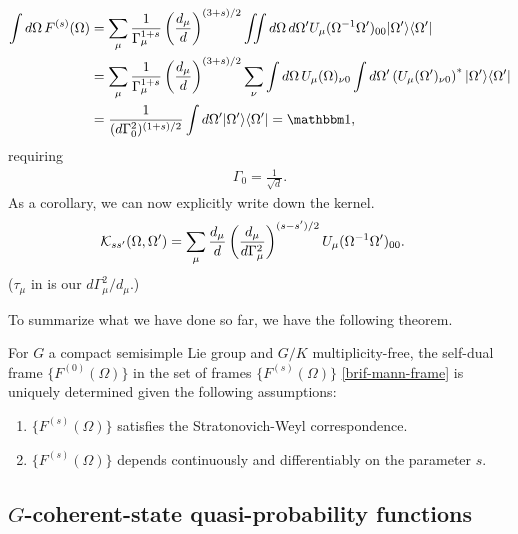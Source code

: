 \begin{align}
\int d\Omega\,F^{(s)}(\Omega) &= \sum_{\mu} \frac{1}{\Gamma_{\mu}^{1+s}} \left( \frac{d_{\mu}}{d} \right)^{(3+s)/2}
\iint d\Omega\,d\Omega' \rep_{\mu}(\Omega^{-1}\Omega')_{00} \ketbra{\Omega'}{\Omega'} \nonumber \\
&= \sum_{\mu} \frac{1}{\Gamma_{\mu}^{1+s}} \left( \frac{d_{\mu}}{d} \right)^{(3+s)/2} \sum_{\nu}
\int d\Omega\,\rep_{\mu} (\Omega)_{\nu 0} \int d\Omega' \left( \rep_{\mu} (\Omega')_{\nu 0} \right)^* \ketbra{\Omega'}{\Omega'} \nonumber \\
&= \frac{1}{(d\Gamma_{0}^2)^{(1+s)/2}} \int d\Omega' \ketbra{\Omega'}{\Omega'} = \id,
\end{align}
requiring
\begin{align}
\Gamma_{0} = \frac{1}{\sqrt{d}}.
\end{align}
As a corollary, we can now explicitly write down the kernel.
\begin{align}
\mathcal{K}_{ss'}(\Omega,\Omega') &= \sum_{\mu} \frac{d_{\mu}}{d} \left( \frac{ d_{\mu}}{d \Gamma^2_{\mu}} \right)^{(s-s')/2} U_{\mu}(\Omega^{-1}\Omega')_{00}.
\end{align}
($\tau_{\mu}$ in \cite{brif_phase-space_1999} is our $d\Gamma_{\mu}^2/d_{\mu}$.)

To summarize what we have done so far, we have the following theorem.
\begin{theorem}\label{thm:brif-mann-frame}
	For $G$ a compact semisimple Lie group and $G/K$ multiplicity-free, the self-dual frame $\{F^{(0)}(\Omega)\}$ in the set of frames $\{F^{(s)}(\Omega)\}$ \eqref{brif-mann-frame} is uniquely determined given the following assumptions:
	\begin{enumerate}
		\item $\{F^{(s)}(\Omega)\}$ satisfies the Stratonovich-Weyl correspondence.
		\item $\{F^{(s)}(\Omega)\}$ depends continuously and differentiably on the parameter $s$.
	\end{enumerate}
\end{theorem}

\subsection{$G$-coherent-state quasi-probability functions}\label{ch3:coherent-wigner-function}

